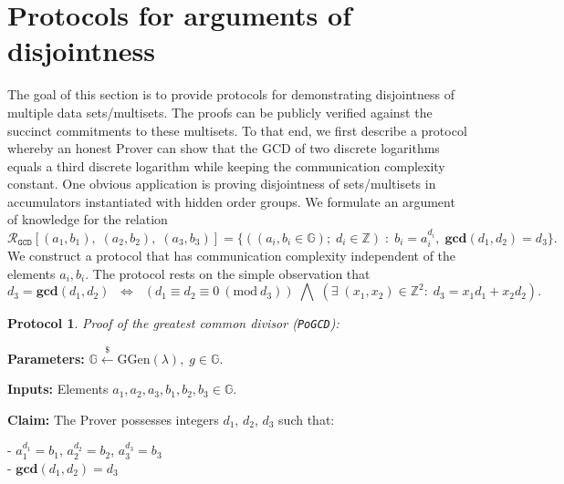 \documentclass[11pt, lettersize, notitlepage, leqno, footskip=0.6cm]{article}
\newcommand{\bz}{\mathbb Z}
\newcommand{\ttt}{\texttt}
\newcommand{\LRA}{\Longleftrightarrow}
\newcommand{\mc}{\mathcal}
\newcommand{\mb}{\mathbb}
\newcommand{\mbf}{\mathbf}
\newcommand{\mr}{\mathrm}
\newcommand{\lamb}{\lambda}
\newcommand{\vs}{\vspace{-0.15cm}}
\newcommand{\Mod}[1]{\ (\mathrm{mod}\ #1)}
\newcommand{\GCD}{\mbf{gcd}}
\newtheorem{Prot}[Thm]{Protocol}
\numberwithin{equation}{section}
\begin{document}
\section{\fontsize{12}{12}\selectfont Protocols for arguments of disjointness}

The goal of this section is to provide protocols for demonstrating disjointness of multiple data sets/multisets. The proofs can be publicly verified against the succinct commitments to these multisets. To that end, we first describe a protocol whereby an honest Prover can show that the GCD of two discrete logarithms equals a third discrete logarithm while keeping the communication complexity constant. One obvious application is proving disjointness of sets/multisets in accumulators instantiated with hidden order groups. We formulate an argument of knowledge for the relation \vs  $$\mc{R}_{{\ttt{GCD}}}[(a_1,b_1),\;(a_2,b_2),\;(a_3,b_3)] = \{((a_i, b_i\in\mb{G});\;d_i\in\bz)\;:\; b_i = a_i^{d_i},\;\GCD(d_1,d_2)=d_3  \} .$$ We construct a protocol that has communication complexity independent of the elements $a_i, b_i$. The protocol rests on the simple observation that \vs $$d_3 = \GCD(d_1, d_2)\;\; \LRA \;\;(d_1\equiv d_2\equiv 0 \Mod{d_3})\;\bigwedge \; \left(\exists \; (x_1,x_2)\in \bz^2:\; d_3 = x_1d_1+x_2d_2  \right).$$
 

\begin{Prot} \normalfont \hypertarget{GCD}{\textit{Proof of the greatest common divisor}} (\verb|PoGCD|):\end{Prot} \vspace{-0.3cm}

\noindent \textbf{Parameters:} $\mb{G}\xleftarrow{\$} \mr{GGen}(\lamb), \; g\in \mb{G}$.

\noindent \textbf{Inputs:} Elements $a_1, a_2, a_3, b_1, b_2, b_3 \in \mb{G}$.

\noindent \textbf{Claim:} The Prover possesses integers $d_1$, $d_2$, $d_3$ such that:

\noindent - $a_1^{d_1} = b_1$, $a_2^{d_2} = b_2$, $a_3^{d_3} = b_3$\\
\noindent - $\GCD(d_1, d_2) = d_3$
 
\end{document}
